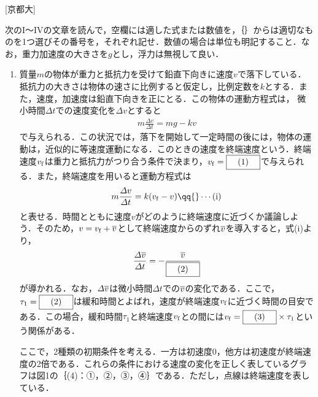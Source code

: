 



\noindent
{} [京都大]

次のI〜IVの文章を読んで，空欄には適した式または数値を，｛{\hzw\hzw}｝からは適切なものを1つ選びその番号を，それぞれ記せ．数値の場合は単位も明記すること．なお，重力加速度の大きさを$g$とし，浮力は無視して良い．

\begin{enumerate}[I]
  \item {\hzw}質量$m$の物体が重力と抵抗力を受けて鉛直下向きに速度$v$で落下している．抵抗力の大きさは物体の速さに比例すると仮定し，比例定数を$k$とする．また，速度，加速度は鉛直下向きを正にとる．この物体の運動方程式は， 微小時間$\varDelta t$での速度変化を$\varDelta v$とすると
  \begin{gather*}
    m\frac{\varDelta v}{\varDelta t} = mg - kv
  \end{gather*}
  で与えられる．この状況では，落下を開始して一定時間の後には，物体の運動は，近似的に等速度運動になる．このときの速度を終端速度という．終端速度$v_\mathrm{f}$は重力と抵抗力がつり合う条件で決まり，$v_\mr{f} = \text{\boxnum{1}}$で与えられる．また，終端速度を用いると運動方程式は
  \begin{gather*}
    m\frac{\varDelta v}{\varDelta t} = k(v_\mr{f} - v)\qq{}\cdots \text{(i)}
  \end{gather*}
  と表せる．時間とともに速度$v$がどのように終端速度に近づくか議論しよう．そのため，$v = v_\mathrm{f} + \overline{v}$として終端速度からのずれ$\overline{v}$を導入すると，式(i)より，
  \begin{gather*}
    \frac{\varDelta \ol{v}}{\varDelta t} = -\frac{\ol{v}}{\text{\boxnum{2}}}
  \end{gather*}
  が導かれる．なお，$\varDelta \overline{v}$は微小時間$\varDelta t$での$\overline{v}$の変化である．ここで，$\tau_1 = \text{\boxnum{2}}$は緩和時間とよばれ，速度が終端速度$v_\mathrm{f}$に近づく時間の目安である．この場合，緩和時間$\tau_1$と終端速度$v_\mathrm{f}$との間には$v_\mr{f} = \text{\boxnum{3}}\times \tau_1$という関係がある．

  {\hzw}ここで，2種類の初期条件を考える．一方は初速度0，他方は初速度が終端速度の2倍である．これらの条件における速度の変化を正しく表しているグラフは図1の｛(4)：①，②，③，④｝である．ただし，点線は終端速度を表している．



\end{enumerate}
